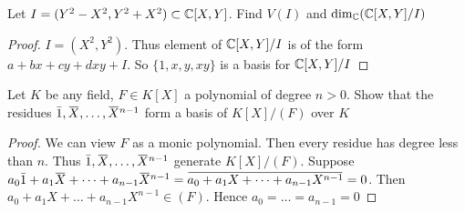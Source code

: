 \documentclass[11pt]{article}
\begin{document}
\begin{exercise}
\label{ex1.36}
Let \(I=(Y^2-X^2,Y^2+X^2)\subset\mathbb{C}[X,Y]\). Find \(V(I)\) and \(\dim_{\mathbb{C}}(\mathbb{C}[X,Y]/I)\)
\end{exercise}

\begin{proof}
\(I=(X^2,Y^2)\). Thus element of  \(\mathbb{C}[X,Y]/I\) is of the form \(a+bx+cy+dxy+I\). So \(\{1,x,y,xy\}\)
is a basis for \(\mathbb{C}[X,Y]/I\)
\end{proof}

\begin{exercise}
\label{1.37}
Let \(K\) be any field, \(F\in K[X]\) a polynomial of degree \(n>0\). Show that the
residues \(\bar{1},\barX,\dots,\barX^{n-1}\) form a basis of \(K[X]/(F)\) over \(K\)
\end{exercise}

\begin{proof}
We can view \(F\) as a monic polynomial. Then every residue has degree less than \(n\).
Thus \(\bar{1},\barX,\dots,\barX^{n-1}\) generate \(K[X]/(F)\).
Suppose \(a_0\bar{1}+a_1\barX+\dots+a_{n-1}\barX^{n-1}=\bbar{a_0+a_1X+\dots+a_{n-1}X^{n-1}}=0\). Then
\(a_0+a_1X+\dots+a_{n-1}X^{n-1}\in(F)\). Hence \(a_0=\dots=a_{n-1}=0\)
\end{proof}
\end{document}
